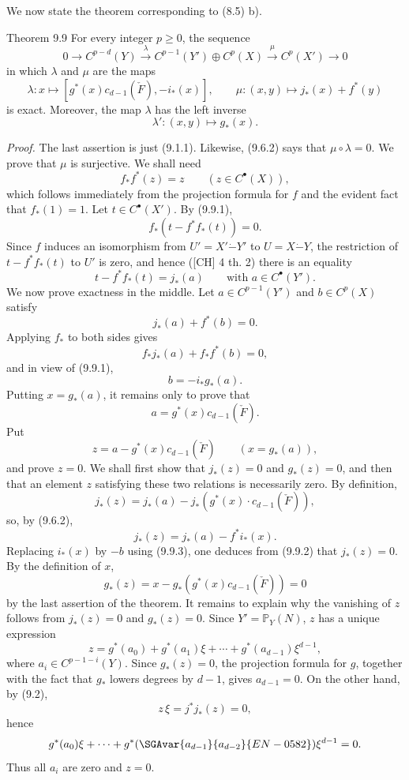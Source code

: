 We now state the theorem corresponding to (8.5) b).

\begin{statement}{Theorem 9.9}
For every integer $p\ge0$, the sequence
\[
0\to C^{p-d}(Y)\xrightarrow{\lambda} C^{p-1}(Y')\oplus C^p(X)\xrightarrow{\mu} C^p(X')\to0
\]
in which $\lambda$ and $\mu$ are the maps
\[
\lambda:x\mapsto[g^*(x)c_{d-1}(\check F),-i_*(x)],
\qquad
\mu:(x,y)\mapsto j_*(x)+f^*(y)
\]
is exact. Moreover, the map $\lambda$ has the left inverse
\[
\lambda':(x,y)\mapsto g_*(x).
\]
\end{statement}

\emph{Proof.} The last assertion is just (9.1.1). Likewise, (9.6.2) says that $\mu\circ\lambda=0$. We prove that $\mu$ is surjective. We shall need
\[
f_*f^*(z)=z\qquad(z\in C^{\bullet}(X)),
\tag{9.9.1}
\]
which follows immediately from the projection formula for $f$ and the evident fact that $f_*(1)=1$. Let $t\in C^{\bullet}(X')$. By (9.9.1),
\[
f_*(t-f^*f_*(t))=0.
\]
Since $f$ induces an isomorphism from $U'=X'\mathbin{\dot{-}}Y'$ to $U=X\mathbin{\dot{-}}Y$, the restriction of $t-f^*f_*(t)$ to $U'$ is zero, and hence ([CH] 4 th. 2) there is an equality
\[
t-f^*f_*(t)=j_*(a)
\qquad\text{with }a\in C^{\bullet}(Y').
\]
We now prove exactness in the middle. Let %
$a\in C^{p-1}(Y')$ and $b\in C^p(X)$ satisfy
\[
j_*(a)+f^*(b)=0.
\tag{9.9.2}
\]
Applying $f_*$ to both sides gives
\[
f_*j_*(a)+f_*f^*(b)=0,
\]
and in view of (9.9.1),
\[
b=-i_*g_*(a).
\tag{9.9.3}
\]
Putting $x=g_*(a)$, it remains only to prove that
\[
a=g^*(x)c_{d-1}(\check F).
\tag{9.9.4}
\]
Put
\[
z=a-g^*(x)c_{d-1}(\check F)\qquad(x=g_*(a)),
\]
and prove $z=0$. We shall first show that $j_*(z)=0$ and $g_*(z)=0$, and then that an element $z$ satisfying these two relations is necessarily zero. By definition,
\[
j_*(z)=j_*(a)-j_*(g^*(x)\cdot c_{d-1}(\check F)),
\]
so, by (9.6.2),
\[
j_*(z)=j_*(a)-f^*i_*(x).
\]
Replacing $i_*(x)$ by $-b$ using (9.9.3), one deduces from (9.9.2) that $j_*(z)=0$. By the definition of $x$,
\[
g_*(z)=x-g_*(g^*(x)c_{d-1}(\check F))=0
\]
by the last assertion of the theorem. It remains to explain why the vanishing of $z$ follows from $j_*(z)=0$ and $g_*(z)=0$. Since $Y'=\mathbb P_Y(N)$, $z$ has a unique expression
\[
z=g^*(a_0)+g^*(a_1)\xi+\cdots+g^*(a_{d-1})\xi^{d-1},
\]
where $a_i\in C^{p-1-i}(Y)$. Since $g_*(z)=0$, the projection formula for $g$, together with the fact that $g_*$ lowers degrees by $d-1$, gives $a_{d-1}=0$. On the other hand, by (9.2),
\[
z\,\xi=j^*j_*(z)=0,
\]
hence
\[
g^*(a_0)\xi+\cdots+g^*(\SGAvar{a_{d-1}}{a_{d-2}}{EN-0582})\xi^{d-1}=0.
\]
Thus all $a_i$ are zero and $z=0$.

